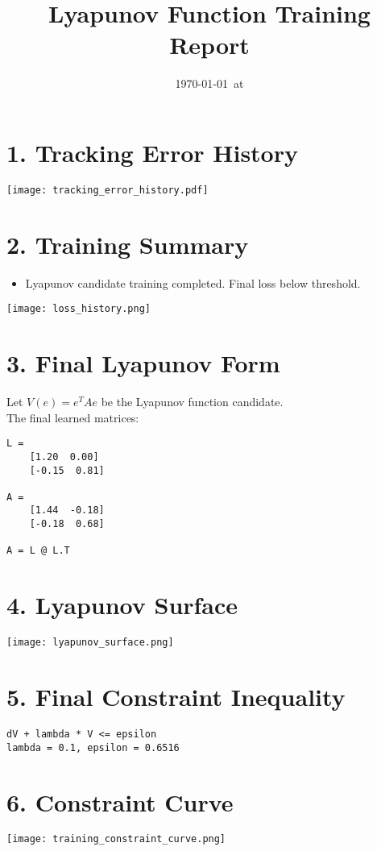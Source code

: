 \documentclass[11pt]{article}
\title{Lyapunov Function Training Report}
\author{}
\date{\today\ at \currenttime}
\begin{document}
\maketitle
\thispagestyle{fancy}

\section*{1. Tracking Error History}
\texttt{[image: tracking\_error\_history.pdf]}

\section*{2. Training Summary}
\begin{itemize}
  \item Lyapunov candidate training completed. Final loss below threshold.
\end{itemize}
\texttt{[image: loss\_history.png]}

\section*{3. Final Lyapunov Form}
Let $V(e) = e^T A e$ be the Lyapunov function candidate. \\
The final learned matrices:
\begin{verbatim}
L = 
    [1.20  0.00]
    [-0.15  0.81]

A = 
    [1.44  -0.18]
    [-0.18  0.68]

A = L @ L.T
\end{verbatim}

\section*{4. Lyapunov Surface}
\texttt{[image: lyapunov\_surface.png]}

\section*{5. Final Constraint Inequality}
\begin{verbatim}
dV + lambda * V <= epsilon
lambda = 0.1, epsilon = 0.6516\end{verbatim}

\section*{6. Constraint Curve}
\texttt{[image: training\_constraint\_curve.png]}
\end{document}
